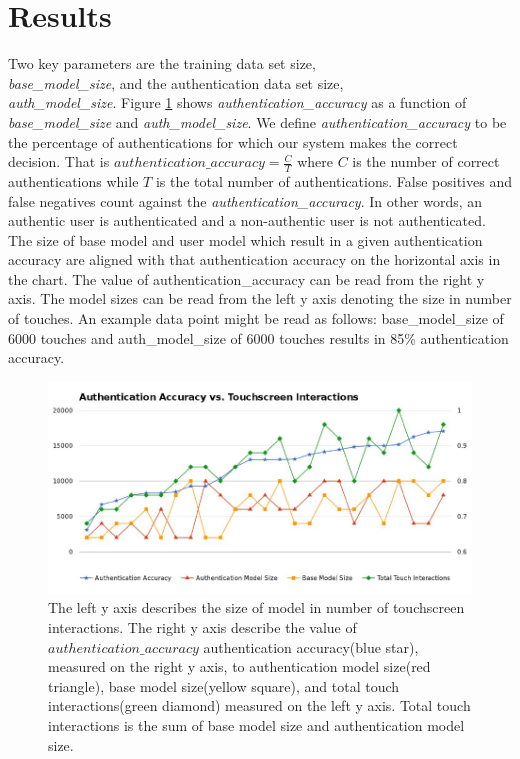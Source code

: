 \documentclass{acm_proc_article-sp}
\begin{document}
\section{Results}
\label{sec:results}

Two key parameters are 
the training data set size,\\
{\it base\_model\_size}, and the 
authentication data set size,\\
{\it auth\_model\_size}.
Figure \ref{fig:authentication_accuracy} shows {\it authentication\_accuracy} 
as a function of {\it base\_model\_size} and {\it auth\_model\_size}.
We define {\it authentication\_accuracy} to be the percentage of authentications for which our system makes the correct decision.
That is $authentication\_accuracy = \frac{C}{T}$ where
$C$ is the number of correct authentications while
$T$ is the total number of authentications.
False positives and false negatives count against the {\it authentication\_accuracy}.
In other words, an authentic user is authenticated and a non-authentic user is not authenticated.
%
The size of base model and user model which result in a given authentication accuracy are aligned with that authentication accuracy on the horizontal axis in the chart.
The value of authentication\_accuracy can be read from the right y axis.
The model sizes can be read from the left y axis 
denoting the size in number of touches.
%
An example data point
might be read as follows: 
base\_model\_size of
6000 touches and auth\_model\_size of 6000 touches
results in 85\% authentication accuracy.

\begin{figure}
\centering
\includegraphics[width=.45\textwidth]{authentication_accuracy_vs_touchscreen_interactions.pdf}
\caption{
The left y axis describes the size of model
in number of touchscreen interactions.
The right y axis describe the value of $authentication\_accuracy$
authentication accuracy(blue star), measured on the right y axis, 
to authentication model size(red triangle),
base model size(yellow square),
and total touch interactions(green diamond)
measured on the left y axis.
Total touch interactions is the sum of
base model size and authentication model size.
}
\label{fig:authentication_accuracy}
\end{figure}
\end{document}
